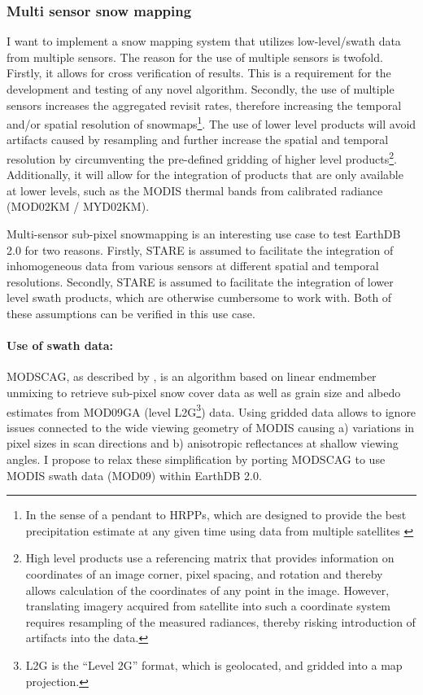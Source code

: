 \documentclass[letterpaper, parskip=half]{scrartcl}
\begin{document}
\subsubsection{Multi sensor snow mapping}
I want to implement a snow mapping system that utilizes low-level/swath data from multiple sensors. The reason for the use of multiple sensors is twofold. Firstly, it allows for cross verification of results. This is a requirement for the development and testing of any novel algorithm. Secondly, the use of multiple sensors increases the aggregated revisit rates, therefore increasing the temporal and/or spatial resolution of snowmaps\footnote{In the sense of a pendant to \glspl{HRPP}, which are designed to provide the best precipitation estimate at any given time using data from multiple satellites \citep{Lettenmaier2015}}.
The use of lower level products will avoid artifacts caused by resampling and further increase the spatial and temporal resolution by circumventing the pre-defined gridding of higher level products\footnote{High level products use a referencing matrix that provides information on coordinates of an image corner, pixel spacing, and rotation and thereby allows calculation of the coordinates of any point in the image. However, translating imagery acquired from satellite into such a coordinate system requires resampling of the measured radiances, thereby risking introduction of artifacts into the data.}. Additionally, it will allow for the integration of products that are only available at lower levels, such as the MODIS thermal bands from calibrated radiance (MOD02KM / MYD02KM).

Multi-sensor sub-pixel snowmapping is an interesting use case to test EarthDB 2.0 for two reasons.
Firstly, \gls{STARE} is assumed to facilitate the integration of inhomogeneous data from various sensors at different spatial and temporal resolutions. 
Secondly, \gls{STARE} is assumed to facilitate the integration of lower level swath products, which are otherwise cumbersome to work with. Both of these assumptions can be verified in this use case.

\paragraph{Use of swath data:}
\gls{MODSCAG}, as described by \citep{Painter2009}, is an algorithm based on linear endmember unmixing to retrieve sub-pixel snow cover data as well as grain size and albedo estimates from MOD09GA (level \gls{L2G}\footnote{L2G is the ``Level 2G'' format, which is geolocated, and gridded into a map projection.}) data. 
Using gridded data allows to ignore issues connected to the wide viewing geometry of MODIS causing a) variations in pixel sizes in scan directions and b) anisotropic reflectances at shallow viewing angles. I  propose to relax these simplification by porting MODSCAG to use MODIS swath data (MOD09) within EarthDB 2.0.
\end{document}

